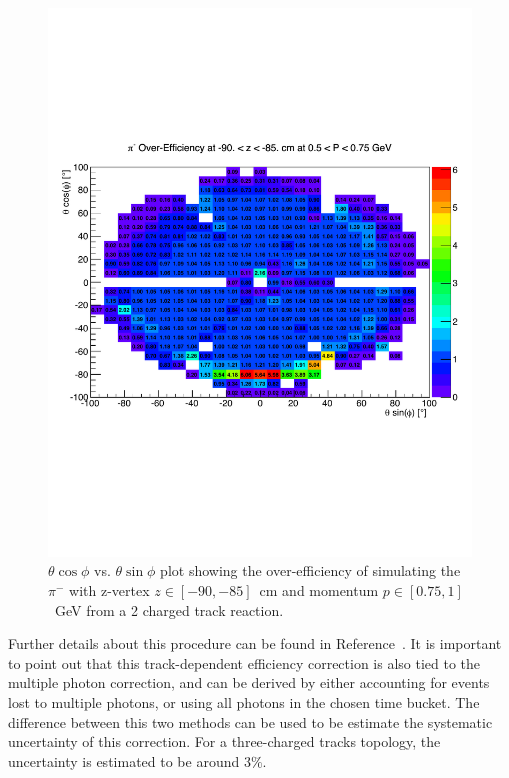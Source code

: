 \begin{figure}[htpb]\begin{center}
\includegraphics[width=1.1 \figwidth,height=\hfigheight]{figures/xsec/Pim_Eff.pdf}
\caption{\label{fig:PimEff} $\theta \cos\phi$ vs. $\theta \sin\phi$ plot showing the over-efficiency of simulating the $\pi^-$ with z-vertex $z \in [-90,-85]$~cm and momentum $p \in [0.75,1]$~GeV from a 2 charged track reaction.}
\end{center}\end{figure}

Further details about this procedure can be found in Reference~\cite{clas.thesis.kunkel}. It is important to point out that this track-dependent efficiency correction is also tied to the multiple photon correction, and can be derived by either accounting for  events lost to multiple photons, or using all photons in the chosen time bucket. The difference between this two methods can be used to be estimate the systematic uncertainty of this correction. For a three-charged tracks topology, the uncertainty is estimated to be around $3 \%$.




